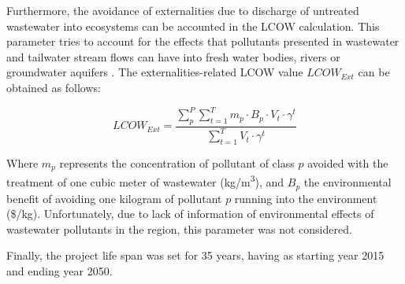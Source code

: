 Furthermore, the avoidance of externalities due to discharge of untreated wastewater into ecosystems can be accounted in the LCOW calculation. This parameter tries to account for the effects that pollutants presented in wastewater and tailwater stream flows can have into fresh water bodies, rivers or groundwater aquifers \cite{Assessmentwastewatertreatment2012}. The externalities-related LCOW value $LCOW_{Ext}$  can be obtained as follows:

\begin{equation}\label{eq:lcow_ext}
LCOW_{Ext} = \frac{\sum_{p}^{P}\sum_{t=1}^{T} m_{p}\cdot B_p\cdot V_{t}\cdot\gamma^{t}}{\sum_{t=1}^{T} V_{t}\cdot\gamma^{t}}
\end{equation}

Where $m_p$ represents the concentration of pollutant of class $p$ avoided with the treatment of one cubic meter of wastewater (kg/m\textsuperscript{3}), and $B_p$ the environmental benefit of avoiding one kilogram of pollutant $p$ running into the environment (\$/kg). Unfortunately, due to lack of information of environmental effects of wastewater pollutants in the region, this parameter was not considered.

Finally, the project life span was set for 35 years, having as starting year 2015 and ending year 2050.

